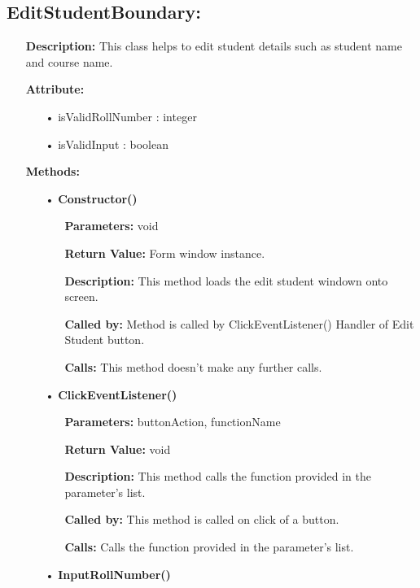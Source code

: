 \documentclass{scrreprt}
\begin{document}
\subsection{EditStudentBoundary:}
\begin{enumerate}
\item[] \textbf{Description:} This class helps to edit student details such as student name and course name.
\item[] \textbf{Attribute:} 
\begin{itemize}
\item [•] isValidRollNumber : integer
\item [•] isValidInput : boolean
\end{itemize}
\item [] \textbf{Methods:}
\begin{itemize}
\item [•] \textbf{Constructor()}
\begin{itemize}
\item [] \textbf{Parameters:} void
\item [] \textbf{Return Value:} Form window instance.
\item [] \textbf{Description:} This method loads the edit student windown onto screen.
\item [] \textbf{Called by:} Method is called by ClickEventListener() Handler of Edit Student button.
\item [] \textbf{Calls:} This method doesn't make any further calls.
\end{itemize}
\end{itemize}
\begin{itemize}
\item [•] \textbf{ClickEventListener()}
\begin{itemize}
\item [] \textbf{Parameters:} buttonAction, functionName 
\item [] \textbf{Return Value:} void
\item [] \textbf{Description:} This method calls the function provided in the parameter's list.
\item [] \textbf{Called by:} This method is called on click of a button.
\item [] \textbf{Calls:} Calls the function provided in the parameter's list.  
\end{itemize}
\end{itemize}
\begin{itemize}
\item [•] \textbf{InputRollNumber()}

\end{itemize}
\end{enumerate}
\end{document}
